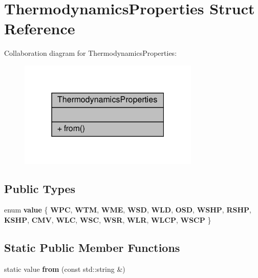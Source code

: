 \hypertarget{structThermodynamicsProperties}{}\section{Thermodynamics\+Properties Struct Reference}
\label{structThermodynamicsProperties}


Collaboration diagram for Thermodynamics\+Properties\+:\nopagebreak
\begin{figure}[H]
\begin{center}
\leavevmode
\includegraphics[width=244pt]{structThermodynamicsProperties__coll__graph}
\end{center}
\end{figure}
\subsection*{Public Types}
\begin{DoxyCompactItemize}
\item 
\mbox{\label{structThermodynamicsProperties_ad59641a76a0ed42fe9b3de205f12300b}} 
enum {\bfseries value} \{ \newline
{\bfseries W\+PC}, 
{\bfseries W\+TM}, 
{\bfseries W\+ME}, 
{\bfseries W\+SD}, 
\newline
{\bfseries W\+LD}, 
{\bfseries O\+SD}, 
{\bfseries W\+S\+HP}, 
{\bfseries R\+S\+HP}, 
\newline
{\bfseries K\+S\+HP}, 
{\bfseries C\+MV}, 
{\bfseries W\+LC}, 
{\bfseries W\+SC}, 
\newline
{\bfseries W\+SR}, 
{\bfseries W\+LR}, 
{\bfseries W\+L\+CP}, 
{\bfseries W\+S\+CP}
 \}
\end{DoxyCompactItemize}
\subsection*{Static Public Member Functions}
\begin{DoxyCompactItemize}
\item 
\mbox{\label{structThermodynamicsProperties_a09e2b261e2fdbbfc0a5883f9b2e42530}} 
static value {\bfseries from} (const std\+::string \&)
\end{DoxyCompactItemize}


